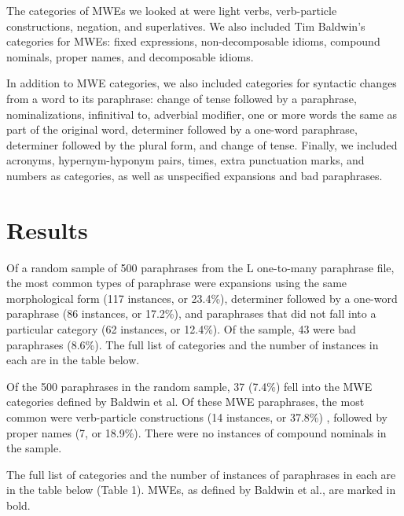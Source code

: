 \documentclass[11pt]{article}
\begin{document}
The categories of MWEs we looked at were light verbs, verb-particle constructions, negation, and superlatives. We also included Tim Baldwin's categories for MWEs: fixed expressions, non-decomposable idioms, compound nominals, proper names, and decomposable idioms. 

In addition to MWE categories, we also included categories for syntactic changes from a word to its paraphrase: change of tense followed by a paraphrase, nominalizations, infinitival to, adverbial modifier, one or more words the same as part of the original word, determiner followed by a one-word paraphrase, determiner followed by the plural form, and change of tense. Finally, we included acronyms, hypernym-hyponym pairs, times, extra punctuation marks, and numbers as categories, as well as unspecified expansions and bad paraphrases.

\section{Results}

Of a random sample of 500 paraphrases from the L one-to-many paraphrase file, the most common types of paraphrase were expansions using the same morphological form (117 instances, or 23.4\%), determiner followed by a one-word paraphrase (86 instances, or 17.2\%), and paraphrases that did not fall into a particular category (62 instances, or 12.4\%). Of the sample, 43 were bad paraphrases (8.6\%). The full list of categories and the number of instances in each are in the table below.  

Of the 500 paraphrases in the random sample, 37 (7.4\%) fell into the MWE categories defined by Baldwin et al. Of these MWE paraphrases, the most common were verb-particle constructions (14 instances, or 37.8\%) , followed by proper names (7, or 18.9\%). There were no instances of compound nominals in the sample.

The full list of categories and the number of instances of paraphrases in each are in the table below (Table 1). MWEs, as defined by Baldwin et al., are marked in bold.
\end{document}
